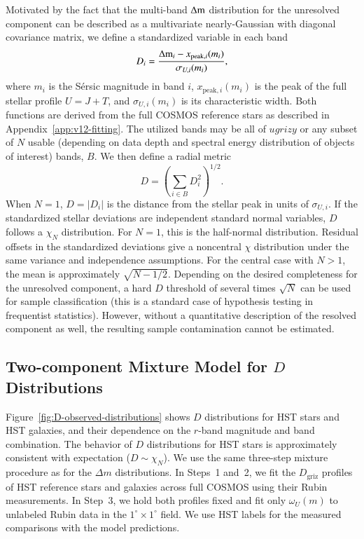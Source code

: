 Motivated by the fact that the multi-band $\mathrm{\Delta m}$ distribution for the unresolved component can
be described as a multivariate nearly-Gaussian with diagonal covariance matrix, we define a standardized
variable in each band
\begin{equation} 
                             D_i = \frac{\mathrm{\Delta m}_i-x_{\mathrm{peak},i}(m_i)}{\sigma_{U,i}(m_i)},
\end{equation}
where \(m_i\) is the S\'{e}rsic magnitude in band \(i\),
\(x_{\mathrm{peak},i}(m_i)\) is the peak of the full stellar profile \(U=J+T\),
and \(\sigma_{U,i}(m_i)\) is its characteristic width. Both functions are derived
from the full COSMOS reference stars as described in Appendix~\ref{app:v12-fitting}.
The utilized bands may be all of
$ugrizy$ or any subset of $N$ usable (depending on data depth and spectral energy distribution of
objects of interest) bands, $B$. We then define a radial metric
\begin{equation} 
                               D = \left( \sum_{i\in B} D_i^2 \right)^{1/2}. 
\end{equation}
When \(N=1\), \(D=|D_i|\) is the distance from the stellar peak in units of
\(\sigma_{U,i}\). If the standardized stellar deviations are independent
standard normal variables, \(D\) follows a \(\chi_N\) distribution. For \(N=1\),
this is the half-normal distribution. Residual offsets in the standardized
deviations give a noncentral \(\chi\) distribution under the same variance and
independence assumptions. For the central case with \(N>1\), the mean is
approximately \(\sqrt{N-1/2}\).
Depending on the desired completeness for the unresolved component, a hard $D$ threshold of
several times $\sqrt{N}$ can be used for sample classification (this is a standard case of
hypothesis testing in frequentist statistics). However, without a quantitative
description of the resolved component as well, the resulting sample contamination cannot be
estimated.

\subsection{Two-component Mixture Model for $D$ Distributions} 


Figure~\ref{fig:D-observed-distributions} shows $D$ distributions for HST stars and HST galaxies,
and their dependence on the $r$-band magnitude and band combination. The behavior of $D$
distributions for HST stars is approximately consistent with expectation ($D \sim \chi_N$).
We use the same three-step mixture procedure as for the \(\Delta m\) distributions.
In Steps~1 and~2, we fit the \(D_{\mathrm{griz}}\) profiles of HST reference stars
and galaxies across full COSMOS using their Rubin measurements. In Step~3, we
hold both profiles fixed and fit only \(\omega_U(m)\) to unlabeled Rubin data in the
\(1^\circ\times1^\circ\) field. We use HST labels for the measured comparisons
with the model predictions.

